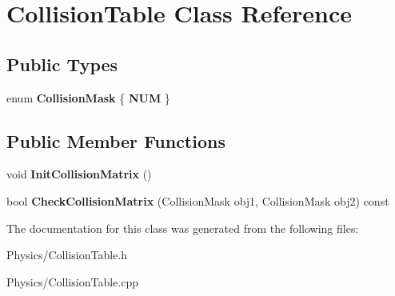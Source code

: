 \hypertarget{classCollisionTable}{}\section{Collision\+Table Class Reference}
\label{classCollisionTable}
\subsection*{Public Types}
\begin{DoxyCompactItemize}
\item 
\mbox{\label{classCollisionTable_abec7701fa63dce6d59a0804b0ba1a69e}} 
enum {\bfseries Collision\+Mask} \{ {\bfseries N\+UM}
 \}
\end{DoxyCompactItemize}
\subsection*{Public Member Functions}
\begin{DoxyCompactItemize}
\item 
\mbox{\label{classCollisionTable_a1b9fda1f06ee74f2ac2539b8676322e4}} 
void {\bfseries Init\+Collision\+Matrix} ()
\item 
\mbox{\label{classCollisionTable_a21c09fb6803e3da3deb9ea9b12648f27}} 
bool {\bfseries Check\+Collision\+Matrix} (Collision\+Mask obj1, Collision\+Mask obj2) const
\end{DoxyCompactItemize}


The documentation for this class was generated from the following files\+:\begin{DoxyCompactItemize}
\item 
Physics/Collision\+Table.\+h\item 
Physics/Collision\+Table.\+cpp\end{DoxyCompactItemize}

